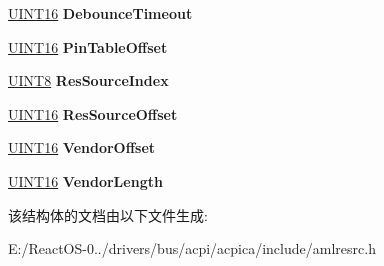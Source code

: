 \begin{DoxyCompactItemize}
\hyperlink{_processor_bind_8h_a09f1a1fb2293e33483cc8d44aefb1eb1}{U\+I\+N\+T16} {\bfseries Debounce\+Timeout}
\item 
\mbox{\label{structaml__resource__gpio_a0095f1545c2d5caa2d935b98b265f748}} 
\hyperlink{_processor_bind_8h_a09f1a1fb2293e33483cc8d44aefb1eb1}{U\+I\+N\+T16} {\bfseries Pin\+Table\+Offset}
\item 
\mbox{\label{structaml__resource__gpio_a9fc91c1d097826bba592efa732c3a645}} 
\hyperlink{_processor_bind_8h_ab27e9918b538ce9d8ca692479b375b6a}{U\+I\+N\+T8} {\bfseries Res\+Source\+Index}
\item 
\mbox{\label{structaml__resource__gpio_a681ef8b63bdc295cd9b9188dfc3a7aee}} 
\hyperlink{_processor_bind_8h_a09f1a1fb2293e33483cc8d44aefb1eb1}{U\+I\+N\+T16} {\bfseries Res\+Source\+Offset}
\item 
\mbox{\label{structaml__resource__gpio_a205ff910a746c234e596a3fb03afe6db}} 
\hyperlink{_processor_bind_8h_a09f1a1fb2293e33483cc8d44aefb1eb1}{U\+I\+N\+T16} {\bfseries Vendor\+Offset}
\item 
\mbox{\label{structaml__resource__gpio_a5f76e6f7e6e1f74897c1063a0c12030e}} 
\hyperlink{_processor_bind_8h_a09f1a1fb2293e33483cc8d44aefb1eb1}{U\+I\+N\+T16} {\bfseries Vendor\+Length}
\end{DoxyCompactItemize}


该结构体的文档由以下文件生成\+:\begin{DoxyCompactItemize}
\item 
E\+:/\+React\+O\+S-\/0../drivers/bus/acpi/acpica/include/amlresrc.\+h\end{DoxyCompactItemize}
